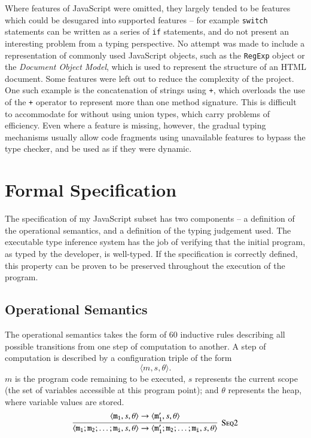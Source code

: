 \documentclass[12pt,a4paper,twoside,openright]{report}
\newcommand*{\js}{\texttt}
\begin{document}
Where features of JavaScript were omitted, they largely tended to be features
which could be desugared into supported features -- for example \js{switch}
statements can be written as a series of \js{if} statements, and do not present
an interesting problem from a typing perspective. No attempt was made to
include a representation of commonly used JavaScript objects, such as the
\js{RegExp} object or the \textit{Document Object Model}, which is used to
represent the structure of an HTML document. Some features were left out to
reduce the complexity of the project. One such example is the concatenation of
strings using \js{+}, which overloads the use of the \js{+} operator to
represent more than one method signature. This is difficult to accommodate for
without using union types, which carry problems of efficiency. Even where a
feature is missing, however, the gradual typing mechanisms usually allow code
fragments using unavailable features to bypass the type checker, and be used as
if they were dynamic.

\section{Formal Specification}

The specification of my JavaScript subset has two components -- a definition of
the operational semantics, and a definition of the typing judgement used. The
executable type inference system has the job of verifying that the initial
program, as typed by the developer, is well-typed. If the specification is
correctly defined, this property can be proven to be preserved throughout the
execution of the program.

\subsection{Operational Semantics}
The operational semantics takes the form of {\color{red}60} inductive rules
describing all possible transitions from one step of computation to another. A
step of computation is described by a configuration triple of the form
$$\langle m, s, \theta\rangle.$$ $m$ is the program code remaining to be
executed, $s$ represents the current scope (the set of variables accessible at
this program point); and $\theta$ represents the heap, where variable values
are stored.
$$\infer[\textsc{Seq2}]
{\langle \mathtt{m_1; m_2; \dots; m_i}, s, \theta\rangle \rightarrow \langle \mathtt{m_1'; m_2; \dots; m_i}, s, \theta\rangle}
{\langle\mathtt{m_1}, s, \theta\rangle\rightarrow\langle \mathtt{m_1'},s, \theta\rangle}$$
\end{document}
